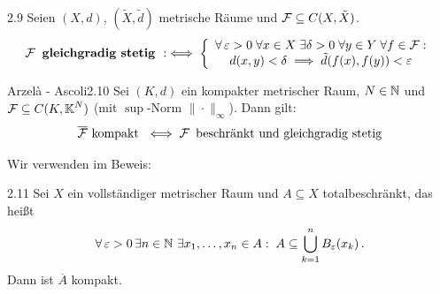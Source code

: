 \documentclass[a4paper]{article}
\begin{document}
\begin{Def}{}{2.9}
Seien $(X,d)$, $(\tilde{X},\tilde{d})$ metrische Räume und $\operatorname{\mathcal{F}}\subseteq C(X,\tilde{X})$.
\[\operatorname{\mathcal{F}}\textbf{ gleichgradig stetig }:\iff 
\left\{\begin{array}{c}
\forall \operatorname{\varepsilon}>0\;\forall x\in X\;\exists \delta>0\; \forall y\in Y\;\forall f\in\operatorname{\mathcal{F}}:\\
d(x,y)<\delta\implies \tilde{d}(f(x),f(y))<\operatorname{\varepsilon}
\end{array}  \right.
\]
\end{Def}

\begin{Satz}{Arzel\`a - Ascoli}{2.10}
Sei $(K,d)$ ein kompakter metrischer Raum, $N\in\operatorname{\mathbb N}$ und $\operatorname{\mathcal{F}}\subseteq C(K,\operatorname{\mathbb K}^N)$ (mit $\sup$-Norm $\|\cdot\|_{\infty}$). Dann gilt:
\[\overline{\operatorname{\mathcal{F}}}\text{ kompakt }\iff \operatorname{\mathcal{F}} \text{ beschränkt und gleichgradig stetig}\]
\end{Satz}

Wir verwenden im Beweis:

\begin{Lemma}{}{2.11}
Sei $X$ ein vollständiger metrischer Raum und $A\subseteq X$ totalbeschränkt, das heißt
\[\forall\operatorname{\varepsilon}>0\,\exists n\in\operatorname{\mathbb N}\,\exists x_1,\ldots,x_n\in A:\; A\subseteq \bigcup_{k=1}^nB_{\operatorname{\varepsilon}}(x_k)\,.\]
Dann ist $\overline A$ kompakt.
\end{Lemma}
\end{document}
